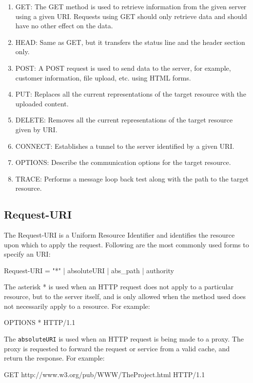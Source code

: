 \documentclass[a4paper,11pt,bahasa]{extarticle}
\begin{document}
\begin{enumerate}
%
\item GET: The GET method is used to retrieve information from the given server using a given URI. 
Requests using GET should only retrieve data and should have no other effect on the data.
%
\item HEAD: Same as GET, but it transfers the status line and the header section only.
%
\item POST: A POST request is used to send data to the server, for example, customer information, file 
upload, etc. using HTML forms.
%
\item PUT: Replaces all the current representations of the target resource with the uploaded content.
%
\item DELETE: Removes all the current representations of the target resource given by URI.
\item CONNECT: Establishes a tunnel to the server identified by a given URI.
\item OPTIONS: Describe the communication options for the target resource.
\item TRACE: Performs a message loop back test along with the path to the target resource.
\end{enumerate}

\subsection{Request-URI}

The Request-URI is a Uniform Resource Identifier and identifies the resource upon which to apply the 
request. Following are the most commonly used forms to specify an URI:
\begin{textcode}
Request-URI = "*" | absoluteURI | abs_path | authority
\end{textcode}
 
The asterisk * is used when an HTTP request does not apply to a particular resource, but to the server 
itself, and is only allowed when the method used does not necessarily apply to a resource. For example:
\begin{textcode}
OPTIONS * HTTP/1.1
\end{textcode}

The \verb|absoluteURI| is used when an HTTP request is being made to a proxy.
The proxy is requested to forward the request or service from a valid cache,
and return the response. For example:
\begin{textcode}
GET http://www.w3.org/pub/WWW/TheProject.html HTTP/1.1
\end{textcode}
\end{document}
